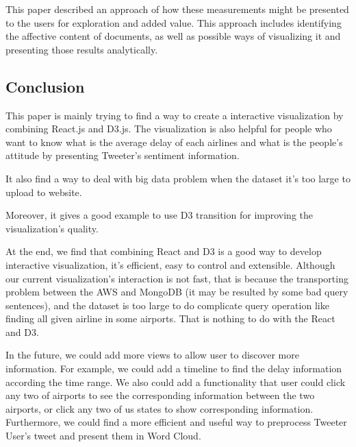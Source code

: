 This paper described an approach of how these measurements might be presented to the users for exploration and added value. This approach includes identifying the affective content of documents, as well as possible ways of visualizing it and presenting those results analytically.\cite{gregory2006user}




\subsection{Conclusion}
\label{sec:conclusion}
This paper is mainly trying to find a way to create a interactive visualization by combining React.js and D3.js. The visualization is also helpful for people who want to know what is the average delay of each airlines and what is the people's attitude by presenting Tweeter's sentiment information. 

It also find a way to deal with big data problem when the dataset it's too large to upload to website. 

Moreover, it gives a good example to use D3 transition for improving the visualization's quality.

At the end, we find that combining React and D3 is a good way to develop interactive visualization, it's efficient, easy to control and extensible. Although our current visualization's interaction is not fast, that is because the transporting problem between the AWS and MongoDB (it may be resulted by some bad query sentences), and the dataset is too large to do complicate query operation like finding all given airline in some airports. That is nothing to do with the React and D3.

In the future, we could add more views to allow user to discover more information. For example, we could add a timeline to find the delay information according the time range. We also could add a functionality that user could click any two of airports to see the corresponding information between the two airports, or click any two of us states to show corresponding information. Furthermore, we could find a more efficient and useful way to preprocess Tweeter User's tweet and present them in Word Cloud.


